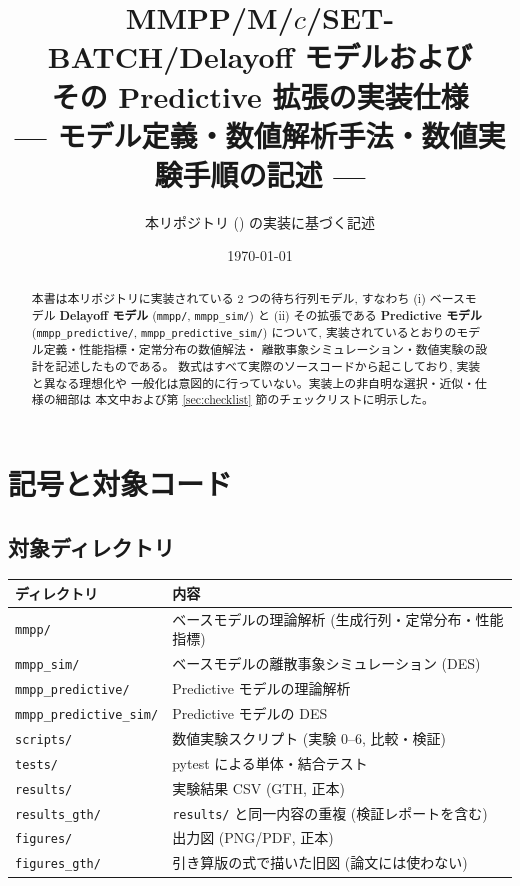 \documentclass[a4paper,11pt]{article}
\title{MMPP/M/$c$/SET-BATCH/Delayoff モデルおよび\\
その Predictive 拡張の実装仕様\\
\large --- モデル定義・数値解析手法・数値実験手順の記述 ---}
\author{本リポジトリ (\code{MMPP\_-}) の実装に基づく記述}
\date{\today}
\newcommand{\code}[1]{\texttt{#1}}
\begin{document}
\maketitle

\begin{abstract}
本書は本リポジトリに実装されている 2 つの待ち行列モデル,
すなわち (i) ベースモデル \textbf{Delayoff モデル}
(\code{mmpp/}, \code{mmpp\_sim/}) と
(ii) その拡張である \textbf{Predictive モデル}
(\code{mmpp\_predictive/}, \code{mmpp\_predictive\_sim/}) について,
実装されているとおりのモデル定義・性能指標・定常分布の数値解法・
離散事象シミュレーション・数値実験の設計を記述したものである。
数式はすべて実際のソースコードから起こしており, 実装と異なる理想化や
一般化は意図的に行っていない。実装上の非自明な選択・近似・仕様の細部は
本文中および第 \ref{sec:checklist} 節のチェックリストに明示した。
\end{abstract}

\tableofcontents

\section{記号と対象コード}

\subsection{対象ディレクトリ}

\begin{center}
\begin{tabular}{ll}
\toprule
ディレクトリ & 内容 \\
\midrule
\code{mmpp/}                 & ベースモデルの理論解析 (生成行列・定常分布・性能指標) \\
\code{mmpp\_sim/}            & ベースモデルの離散事象シミュレーション (DES) \\
\code{mmpp\_predictive/}     & Predictive モデルの理論解析 \\
\code{mmpp\_predictive\_sim/}& Predictive モデルの DES \\
\code{scripts/}              & 数値実験スクリプト (実験 0--6, 比較・検証) \\
\code{tests/}                & pytest による単体・結合テスト \\
\code{results/}              & 実験結果 CSV (GTH, 正本) \\
\code{results\_gth/}          & \code{results/} と同一内容の重複 (検証レポートを含む) \\
\code{figures/}              & 出力図 (PNG/PDF, 正本) \\
\code{figures\_gth/}          & 引き算版の式で描いた旧図 (論文には使わない) \\
\bottomrule
\end{tabular}
\end{center}
\end{document}
